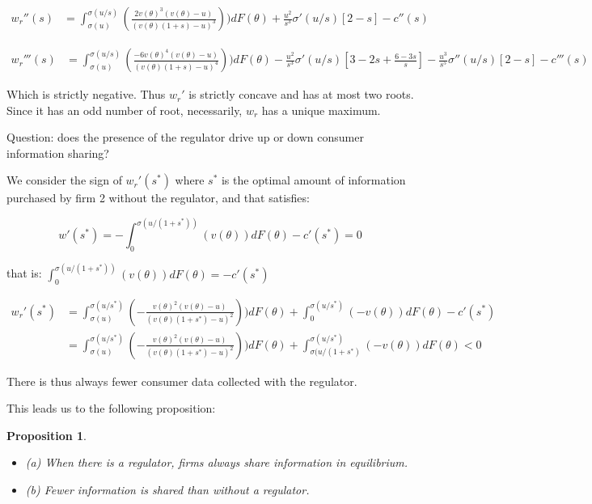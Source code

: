 \documentclass[a4paper,leqno]{article}%
\newtheorem{prop}{Proposition}
\renewcommand{\t}{\theta}
\newcommand{\s}{\sigma}
\begin{document}
\medskip

\begin{equation}
    \begin{aligned}
w_r''(s)&=\int_{\s(u)}^{\s(u/s)}(\frac{2v(\t)^3(v(\t)-u)}{(v(\t)(1+s)-u)^3}))dF(\t)+\frac{u^2}{s^3}\s'(u/s)[2-s]-c''(s)
\end{aligned}
\end{equation}


\medskip

\begin{equation}
    \begin{aligned}
w_r'''(s)&=\int_{\s(u)}^{\s(u/s)}(\frac{-6v(\t)^4(v(\t)-u)}{(v(\t)(1+s)-u)^4}))dF(\t)-\frac{u^2}{s^3}\s'(u/s)[3-2s+\frac{6-3s}{s}]-\frac{u^3}{s^5}\s''(u/s)[2-s]-c'''(s)
\end{aligned}
\end{equation}

Which is strictly negative. Thus $w_r'$ is strictly concave and has at most two roots. Since it has an odd number of root, necessarily, $w_r$ has a unique maximum. 

\medskip

Question: does the presence of the regulator drive up or down consumer information sharing?

\medskip

We consider the sign of $w_r'(s^*)$ where $s^*$ is the optimal amount of information purchased by firm 2 without the regulator, and that satisfies:


\[
w'(s^*)=-\int_{0}^{\s(u/(1+s^*))}(v(\t))dF(\t)-c'(s^*)=0
\]

that is: $\int_{0}^{\s(u/(1+s^*))}(v(\t))dF(\t)=-c'(s^*)$

\begin{equation}
    \begin{aligned}
w_r'(s^*)&=\int_{\s(u)}^{\s(u/s^*)}(-\frac{v(\t)^2(v(\t)-u)}{(v(\t)(1+s^*)-u)^2}))dF(\t)+\int_{0}^{\s(u/s^*)}(-v(\t))dF(\t)-c'(s^*)\\
    &=\int_{\s(u)}^{\s(u/s^*)}(-\frac{v(\t)^2(v(\t)-u)}{(v(\t)(1+s^*)-u)^2}))dF(\t)+\int_{\s(u/(1+s^*)}^{\s(u/s^*)}(-v(\t))dF(\t)<0
\end{aligned}
\end{equation}

There is thus always fewer consumer data collected with the regulator.

\medskip 

This leads us to the following proposition:

\begin{prop}~~\label{prop:2}

\begin{itemize}
    \item (a) When there is a regulator, firms always share information in equilibrium.
    \item (b) Fewer information is shared than without a regulator.
\end{itemize} 
\end{prop}
\end{document}
